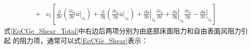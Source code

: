 \begin{equation}
\begin{aligned}
                                                                      \\
                                                            +&\nu_{t}
                                                            \left[
                                                              \frac{\partial}{\partial x}
                                                              \left(
                                                                \frac{\partial z_{b}}{\partial x}
                                                                \left.\overline{u}\right|_{z_{b}}
                                                                \right)
                                                                +
                                                                \frac{\partial}{\partial y}
                                                                \left(
                                                                  \frac{\partial z_{b}}{\partial y}
                                                                  \left.\overline{u}\right|_{z_{b}}
                                                                  \right)
                                                                  +
                                                                  \left.\frac{\partial \overline{u}}{\partial x}\right|_{z_{b}}
                                                                    \frac{\partial z_{b}}{\partial x}
                                                                    +
                                                                    \left.\frac{\partial \overline{u}}{\partial y}\right|_{z_{b}}
                                                                      \frac{\partial z_{b}}{\partial y}
                                                                      -
                                                                      \left.\frac{\partial \overline{u}}{\partial z}\right|_{z_{b}}
                                                                      \right]
                                                          \end{aligned}
                                                          \label{EqCGe_Shear_Total}
                                                        \end{equation}
                                                        式\eqref{EqCGe_Shear_Total}中右边后两项分别为由底部床面阻力和自由表面风阻力引起
                                                        的阻力项，通常可以式\eqref{EqCGe_Shear}表示：
